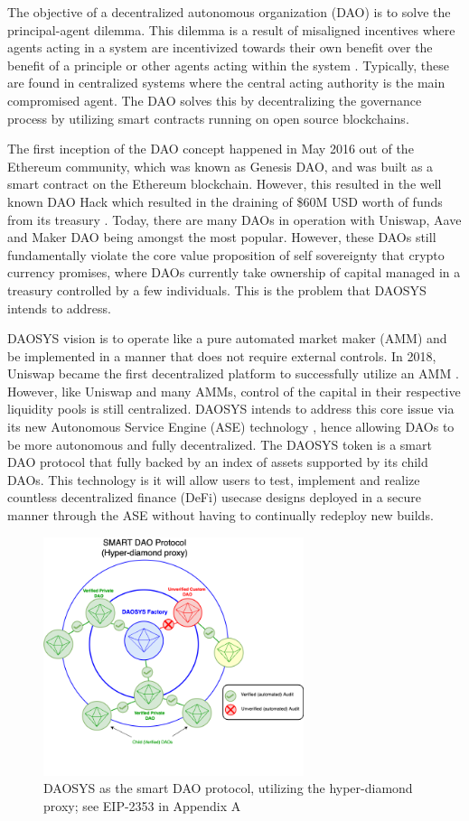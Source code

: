 \documentclass[journal,twocolumn,12pt]{ieeesyscoin}
\begin{document}
The objective of a decentralized autonomous organization (DAO) is to solve the principal-agent dilemma. This dilemma is a result of misaligned incentives where agents acting in a system are incentivized towards their own benefit over the benefit of a principle or other agents acting within the system \cite{San83}. Typically, these are found in centralized systems where the central acting authority is the main compromised agent. The DAO solves this by decentralizing the governance process by utilizing smart contracts running on open source blockchains.

The first inception of the DAO concept happened in May 2016 out of the Ethereum community, which was known as Genesis DAO, and was built as a smart contract on the Ethereum blockchain. However, this resulted in the well known DAO Hack which resulted in the draining of \$60M USD worth of funds from its treasury \cite{Sie22}. Today, there are many DAOs in operation with Uniswap, Aave and Maker DAO being amongst the most popular. However, these DAOs still fundamentally violate the core value proposition of self sovereignty that crypto currency promises, where DAOs currently take ownership of capital managed in a treasury controlled by a few individuals. This is the problem that DAOSYS intends to address.

DAOSYS vision is to operate like a pure automated market maker (AMM) and be implemented in a manner that does not require external controls. In 2018, Uniswap became the first decentralized platform to successfully utilize an AMM \cite{Uni19}. However, like Uniswap and many AMMs, control of the capital in their respective liquidity pools is still centralized. DAOSYS intends to address this core issue via its new Autonomous Service Engine (ASE) technology \cite{Sys22}, hence allowing DAOs to be more autonomous and fully decentralized. The DAOSYS token is a smart DAO protocol that fully backed by an index of assets supported by its child DAOs. This technology is it will allow users to test, implement and realize countless decentralized finance (DeFi) usecase designs deployed in a secure manner through the ASE without having to continually redeploy new builds.

\begin{figure}[h!]
\includegraphics[width=3in]{img/smart_dao.png}
\caption{DAOSYS as the smart DAO protocol, utilizing the hyper-diamond proxy; see EIP-2353 in Appendix A} 
\label{fig:daosys_governance}
\end{figure}
\end{document}
